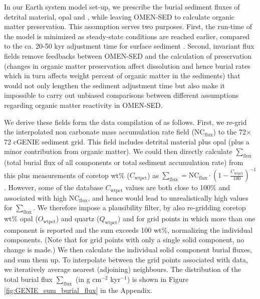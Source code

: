 \documentclass[gmd, manuscript]{copernicus}
\begin{document}
In our Earth system model set-up, we prescribe the burial sediment fluxes of detrital material, opal and , while leaving OMEN-SED to calculate organic matter preservation. This assumption serves two purposes. 
First, the run-time of the model is minimized as steady-state conditions are reached earlier, compared to the ca. 20-50 kyr adjustment time for surface sediment  \citep{ridgwell_regulation_2007}. 
Second, invariant flux fields remove feedbacks between OMEN-SED and the calculation of  preservation (changes in organic matter preservation affect  dissolution and hence burial rates which in turn affects 
weight percent of organic matter in the sediments) that would not only lengthen the sediment adjustment time but also make it impossible to carry out unbiased comparisons between different assumptions regarding organic matter reactivity in OMEN-SED. 

We derive these fields form the data compilation of \citet{archer_data-driven_1996} as follows. First, we re-grid the \citet{archer_data-driven_1996} interpolated non carbonate mass accumulation rate field (NC$_\mathrm{flux}$) to the 72$\times$72 
cGENIE sediment grid. This field includes detrital material plus opal (plus a minor contribution from organic matter). We could then directly calculate $\sum_\mathrm{flux}$ (total burial flux of all components or total sediment accumulation rate) 
from this plus measurements of coretop wt\%  ($C_\mathrm{wtpct}$) \citep{archer_data-driven_1996} as $\sum_\mathrm{flux} = \mathrm{NC}_\mathrm{flux} \cdot (1-\frac{C_\mathrm{wtpct}}{100})^{-1}$. 
However, some of the \citet{archer_data-driven_1996} database $C_\mathrm{wtpct}$ values are both close to 100\% and associated with high NC$_\mathrm{flux}$, and hence would lead to unrealistically high values for $\sum_\mathrm{flux}$. 
We therefore impose a plausibility filter, by also re-gridding coretop wt\% opal ($O_\mathrm{wtpct}$) and quartz ($Q_\mathrm{wtpct}$) and for grid points in which more than one component is reported and the sum exceeds 100 wt\%, 
normalizing the individual components. (Note that for grid points with only a single solid component, no change is made.) We then calculate the individual solid component burial fluxes, and sum them up. 
To interpolate between the grid points associated with data, we iteratively average nearest (adjoining) neighbours. The distribution of the total burial flux $\sum_\mathrm{flux}$ (in g cm$^{-2}$ kyr$^{-1}$) is shown in 
Figure \ref{fig:GENIE_sum_burial_flux} in the Appendix. 
\end{document}
